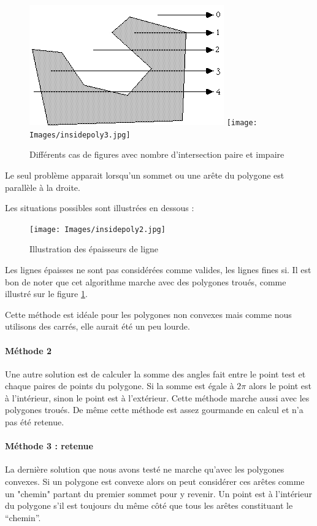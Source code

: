 \documentclass[a4paper,12pt]{report}
\begin{document}
\begin{figure}[h]
\centering
\includegraphics[scale=0.6]{Images/insidepoly1.jpg}
\texttt{[image: Images/insidepoly3.jpg]}
\caption{Différents cas de figures avec nombre d'intersection paire et impaire}
\label{nbintersect}
\end{figure}
\vspace{0.5cm}

Le seul problème apparait lorsqu'un sommet ou une arête du polygone est parallèle à la droite.

Les situations possibles sont illustrées en dessous :

\begin{figure}[h]
\centering
\texttt{[image: Images/insidepoly2.jpg]}
\caption{Illustration des épaisseurs de ligne}
\end{figure}
\vspace{0.5cm}

Les lignes épaisses ne sont pas considérées comme valides, les lignes fines si.
Il est bon de noter que cet algorithme marche avec des polygones troués, comme illustré sur le figure \ref{nbintersect}.

Cette méthode est idéale pour les polygones non convexes mais comme nous utilisons des carrés, elle aurait été un peu lourde.

\paragraph{Méthode 2 }
Une autre solution est de calculer la somme des angles fait entre le point test et chaque paires de points du polygone. Si la somme est égale à $2\pi$ alors le point est à l'intérieur, sinon le point est à l'extérieur. 
Cette méthode marche aussi avec les polygones troués.
De même cette méthode est assez gourmande en calcul et n'a pas été retenue.

\paragraph{Méthode 3 : retenue}
La dernière solution que nous avons testé ne marche qu'avec les polygones convexes. Si un polygone est convexe alors on peut considérer ces arêtes comme un "chemin" partant du premier sommet pour y revenir. 
Un point est à l'intérieur du polygone s'il est toujours du même côté que tous les arêtes constituant le ``chemin''.
\end{document}
